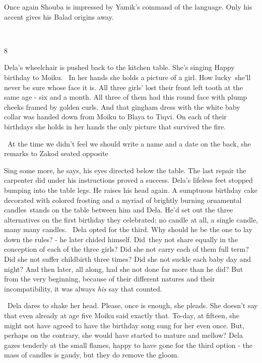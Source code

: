 \documentclass[letterpaper]{article}
\begin{document}
Once again Shouba is impressed by Yamik's command of the language. Only his accent gives his Balad origins away.

~

8 

Dela's wheelchair is pushed back to the kitchen table. She's singing {\textquotedbl}Happy birthday to
Moiku{\textquotedbl}. ~In her hands she holds a picture of a girl. How lucky~she'll never be sure whose face it is. All
three girls' lost their front left tooth at the same age - six and a month. All three of them had this round face with
plump cheeks framed by golden curls. And that gingham dress with the white baby collar was handed down from Moiku to
Blaya to Tiqvi. On each of their birthdays she holds in her hands the only picture that survived the fire. 

\ {\textquotedbl}At the time we didn't feel we should write a name and a date on the back,{\textquotedbl} she remarks to
Zakod seated opposite

{\textquotedbl}Sing some more,{\textquotedbl} he says, his eyes directed below the table. The last repair the carpenter
did under his instructions proved a success. Dela's lifeless feet stopped bumping into the table legs. He raises his
head again. A sumptuous birthday cake decorated with colored frosting and a myriad of brightly burning ornamental
candles~stands on the table between him and Dela. He'd set out the three alternatives on the first birthday they
celebrated: no candle at all, a single candle, many many candles.~ Dela opted for the third. Why should he be the one
to lay down the rules? - he later chided himself. Did~they not share equally in the conception of each of the three
girls? Did she not carry each of them full term? Did she not suffer childbirth three times? Did she not suckle each
baby day and night? And then later, all along, had she not done far more than he did? But from the very beginning,
because of their different natures and their incompatibility, it was always \textit{his} say that counted.

~Dela dares to shake her head. {\textquotedbl}Please, once is enough,{\textquotedbl} she pleads. She doesn't say that
even already at age five Moiku said exactly that. To-day, at fifteen, she might not have agreed to have the birthday
song sung for her even once. But, perhaps on the contrary, she would have started to mature and mellow? Dela gazes
tenderly at the small flames, happy to have gone for the third option - the mass of candles is gaudy, but they do
remove the gloom.
\end{document}
